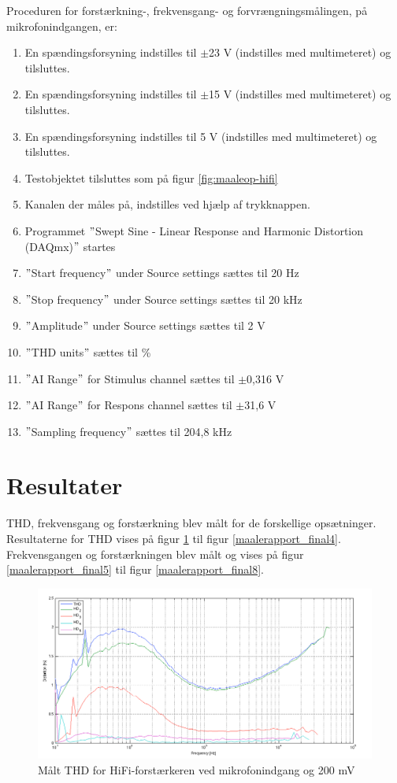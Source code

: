 Proceduren for forstærkning-, frekvensgang- og forvrængningsmålingen, på mikrofonindgangen, er:

\begin{enumerate}
\item En spændingsforsyning indstilles til $\pm$23 V (indstilles med multimeteret) og tilsluttes.
\item En spændingsforsyning indstilles til $\pm$15 V (indstilles med multimeteret) og tilsluttes.
\item En spændingsforsyning indstilles til 5 V (indstilles med multimeteret) og tilsluttes.
\item Testobjektet tilsluttes som på figur \ref{fig:maaleop-hifi}
\item Kanalen der måles på, indstilles ved hjælp af trykknappen.
\item Programmet $"$Swept Sine - Linear Response and Harmonic Distortion (DAQmx)$"$ startes
\item $"$Start frequency$"$ under Source settings sættes til 20 Hz
\item $"$Stop frequency$"$ under Source settings sættes til 20 kHz
\item $"$Amplitude$"$ under Source settings sættes til 2 V
\item $"$THD units$"$ sættes til \%
\item $"$AI Range$"$ for Stimulus channel sættes til $\pm$0,316 V
\item $"$AI Range$"$ for Respons channel sættes til $\pm$31,6 V
\item $"$Sampling frequency$"$ sættes til 204,8 kHz
\end{enumerate}

\section*{Resultater}

THD, frekvensgang og forstærkning blev målt for de forskellige opsætninger. Resultaterne for THD vises på figur \ref{maalerapport_final1} til figur \ref{maalerapport_final4}. Frekvensgangen og forstærkningen blev målt og vises på figur \ref{maalerapport_final5} til figur \ref{maalerapport_final8}.

\begin{figure}[h]
\centering
\includegraphics[width=\textwidth]{maalerapporter/final/mic/final_mic_3,16mv_thd.png}
\caption{Målt THD for HiFi-forstærkeren ved mikrofonindgang og 200 mV}
\label{maalerapport_final1}
\end{figure}

